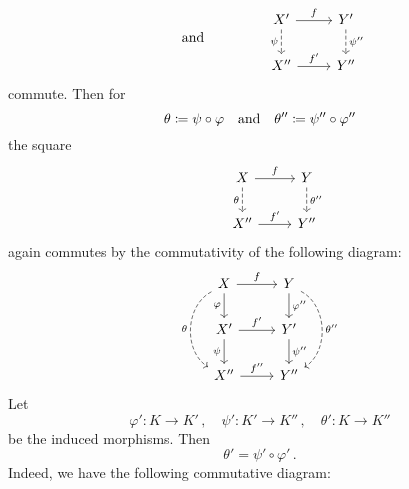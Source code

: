 \begin{remark*}
\begin{enumerate}
\begin{itemize}
\[\begin{tikzcd}
            \end{tikzcd}
            \qquad\text{and}\qquad
            \begin{tikzcd}
              & X'
                \arrow{r}[above]{f}
                \arrow[dashed]{d}[left]{\psi}
              & Y'
                \arrow[dashed]{d}[right]{\psi''}
              \\
              & X''
                \arrow{r}[above]{f'}
              & Y''
            \end{tikzcd}
          \]
          commute.
          Then for
          \[
                      \theta
            \coloneqq  \psi \circ  \varphi
            \quad\text{and}\quad
                      \theta''
            \coloneqq  \psi'' \circ \varphi''
          \]
          the square
          \[
            \begin{tikzcd}
              & X
                \arrow{r}[above]{f}
                \arrow[dashed]{d}[left]{\theta}
              & Y
                \arrow[dashed]{d}[right]{\theta''}
              \\
              & X''
                \arrow{r}[above]{f'}
              & Y''
            \end{tikzcd}
          \]
          again commutes by the commutativity of the following diagram:
          \[
            \begin{tikzcd}
                X
                \arrow{r}[above]{f}
                \arrow{d}[left]{\varphi}
                \arrow[dashed, bend right = 60]{dd}[left]{\theta}
              & Y
                \arrow{d}[right]{\varphi''}
                \arrow[dashed, bend left = 60]{dd}[right]{\theta''}
              \\
                X'
                \arrow{r}[above]{f'}
                \arrow{d}[left]{\psi}
              & Y'
                \arrow{d}[right]{\psi''}
              \\
                X''
                \arrow{r}[above]{f''}
              & Y''
            \end{tikzcd}
          \]
          Let
          \[
            \varphi' \colon K \to K' \,,
            \quad
            \psi' \colon K' \to K'' \,,
            \quad
            \theta' \colon K \to K''
          \]
          be the induced morphisms.
          Then
          \[
              \theta'
            = \psi' \circ \varphi'  \,.
          \]
          Indeed, we have the following commutative diagram:
          \[
            \begin{tikzcd}[sep = huge]

\end{tikzcd}\]
\end{itemize}
\end{enumerate}
\end{remark*}
